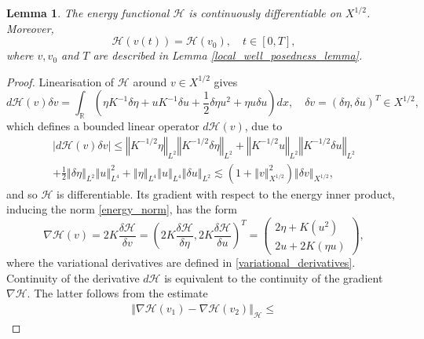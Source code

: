 \documentclass[reqno,12pt,a4paper]{article}
\theoremstyle{plain}
\newtheorem{lemma}[theorem]{\bf Lemma}
\newcommand{\R}{\mathbb{R}}
\newcommand{\Abs}[1]{\left\vert #1 \right\vert}
\newcommand{\norm}[1]{\left\Vert #1 \right\Vert}
\begin{document}
\begin{lemma}
The energy functional $\mathcal H$ is continuously differentiable on $X^{1/2}$.
Moreover,
\[
    \mathcal H(v(t))
    =
    \mathcal H(v_0)
    , \quad
    t \in [0, T],
\]
where $v, v_0$ and $T$ are described in Lemma \ref{local_well_posedness_lemma}.
\end{lemma}

\begin{proof}
%
Linearisation of $\mathcal H$ around $v \in X^{1/2}$
gives
\[
    d \mathcal H(v) \delta v
    =
	\int_\R
	\left(
		\eta K^{-1} \delta \eta
		+
        u K^{-1} \delta u
		+
        \frac 12 \delta \eta u^2
        +
        \eta u \delta u
	\right)
	dx
    , \quad
    \delta v = ( \delta \eta, \delta u )^T \in X^{1/2}
    ,
\]
which defines a bounded linear operator $d \mathcal H(v)$,
due to
\begin{multline*}
    \Abs{d \mathcal H(v) \delta v}
    \leqslant
    \norm{
		K^{-1/2} \eta
    }_{L^2}
    \norm{
        K^{-1/2} \delta \eta
    }_{L^2}
    +
    \norm{
        K^{-1/2} u
    }_{L^2}
    \norm{
        K^{-1/2} \delta u
    }_{L^2}
    \\
    +
    \frac 12
    \norm{
        \delta \eta
    }_{L^2}
    \norm{
        u
    }_{L^4}^2
    +
    \norm{
        \eta
    }_{L^4}
    \norm{
        u
    }_{L^4}
    \norm{
        \delta u
    }_{L^2}
    \lesssim
    \left(
        1 + \norm{v}_{X^{1/2}}^2
    \right)
    \norm{\delta v}_{X^{1/2}}
    ,
\end{multline*}
and so $\mathcal H$ is differentiable.
Its gradient with respect to the energy inner product, inducing the norm \eqref{energy_norm},
has the form
\[
    \nabla \mathcal H(v)
    =
    2 K
    \frac{ \delta \mathcal H }{ \delta v }
    =
    \left(
        2 K
        \frac{ \delta \mathcal H }{ \delta \eta }
        ,
        2 K
        \frac{ \delta \mathcal H }{ \delta u }
    \right)^T
    =
    \begin{pmatrix}
        2 \eta + K \left( u^2 \right)
        \\
        2 u + 2 K \left( \eta u \right)
    \end{pmatrix}
    ,
\]
where the variational derivatives are defined in \eqref{variational_derivatives}.
Continuity of the derivative $d \mathcal H$ is equivalent to
the continuity of the  gradient $\nabla \mathcal H$.
The latter follows from the estimate
\begin{multline*}
    \norm{ \nabla \mathcal H(v_1) - \nabla \mathcal H(v_2) }_{\mathcal H}
    \leqslant

\end{multline*}
\end{proof}
\end{document}
